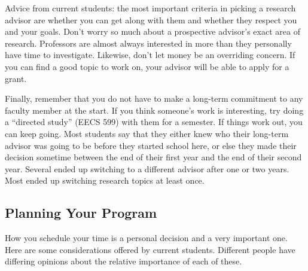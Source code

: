 \documentclass[11pt]{article}
\begin{document}
Advice from current students: the most important criteria in picking a
research advisor are whether you can get along with them and whether
they respect you and your goals.  Don't worry so much about a
prospective advisor's exact area of research.  Professors are almost
always interested in more than they personally have time to
investigate.  Likewise, don't let money be an overriding concern.  If
you can find a good topic to work on, your advisor will be able to
apply for a grant.

Finally, remember that you do not have to make a long-term commitment
to any faculty member at the start.  If you think someone's work is
interesting, try doing a “directed study” (EECS 599) with them for a
semester.  If things work out, you can keep going.  Most students say
that they either knew who their long-term advisor was going to be
before they started school here, or else they made their decision
sometime between the end of their first year and the end of their
second year.  Several ended up switching to a different advisor after
one or two years.  Most ended up switching research topics at least
once.
\subsection{Planning Your Program}
\label{sec-5_4}

How you schedule your time is a personal decision and a very important
one.  Here are some considerations offered by current students.
Different people have differing opinions about the relative importance
of each of these.
\end{document}
